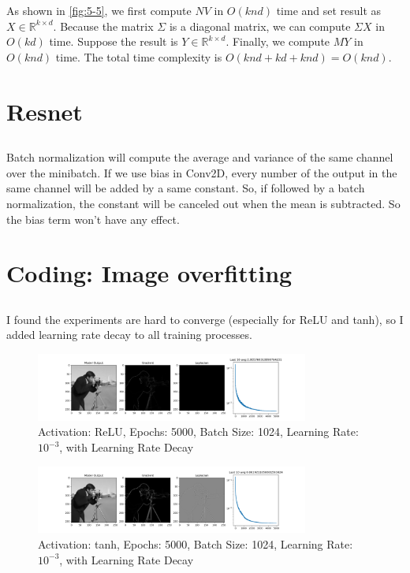 \documentclass[12pt]{article}
\begin{document}
As shown in \ref*{fig:5-5}, we first compute $N V$ in $O(knd)$ time and set result as $X \in \mathbb{R}^{k\times d}$. Because the matrix $\varSigma$ is a diagonal matrix, we can compute $\varSigma X$ in $O(kd)$ time. Suppose the result is $Y \in \mathbb{R}^{k\times d}$. 
Finally, we compute $M Y$ in $O(knd)$ time. The total time complexity is $O(knd + kd + knd) = O(knd)$.
\section{Resnet}
\setcounter{subsection}{1}
\subsection{}
Batch normalization will compute the average and variance of the same channel over the minibatch.
If we use bias in Conv2D, every number of the output in the same channel will be added by a same constant. So, if followed by a batch normalization, the constant will be canceled out when the mean is subtracted. So the bias term won't have any effect.

\newpage

\section{Coding: Image overfitting}
\setcounter{subsection}{4}
\subsection{}
I found the experiments are hard to converge (especially for ReLU and tanh), so I added learning rate decay to all training processes. 
\begin{figure}[H]
    \centering
    \includegraphics[width=0.8\textwidth]{imgs/siren_relu_e5000_b1024_lr10-3_decay.png}
    \caption{Activation: ReLU, Epochs: 5000, Batch Size: 1024, Learning Rate: $10^{-3}$, with Learning Rate Decay}
    \label{fig:5-5-relu}
\end{figure}

\begin{figure}[H]
    \centering
    \includegraphics[width=0.8\textwidth]{imgs/siren_tanh_e5000_b1024_lr10-3_decay.png}
    \caption{Activation: tanh, Epochs: 5000, Batch Size: 1024, Learning Rate: $10^{-3}$, with Learning Rate Decay}
    \label{fig:5-5-tanh}
\end{figure}
\end{document}

